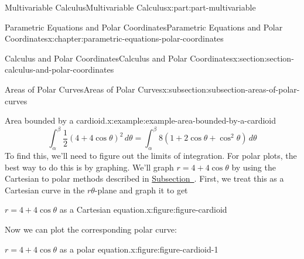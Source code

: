 \documentclass[twoside,10pt,]{book}
\numberwithin{equation}{part}
\begin{document}
\begin{partptx}{Multivariable Calculus}{}{Multivariable Calculus}{}{}{x:part:part-multivariable}
\begin{chapterptx}{Parametric Equations and Polar Coordinates}{}{Parametric Equations and Polar Coordinates}{}{}{x:chapter:parametric-equations-polar-coordinates}
\begin{sectionptx}{Calculus and Polar Coordinates}{}{Calculus and Polar Coordinates}{}{}{x:section:section-calculus-and-polar-coordinates}
\begin{subsectionptx}{Areas of Polar Curves}{}{Areas of Polar Curves}{}{}{x:subsection:subsection-areas-of-polar-curves}
\begin{example}{Area bounded by a cardioid.}{x:example:example-area-bounded-by-a-cardioid}
\begin{equation*}
\int_{\alpha}^{\beta}\frac{1}{2}(4+4\cos\theta)^{2}\,d\theta = \int_{\alpha}^{\beta}8(1+2\cos\theta+\cos^{2}\theta)\,d\theta
\end{equation*}
To find this, we'll need to figure out the limits of integration. For polar plots, the best way to do this is by graphing. We'll graph \(r=4+4\cos\theta\) by using the Cartesian to polar methods described in \hyperref[x:subsection:subsection-cartesian-to-polar-method]{Subsection~}. First, we treat this as a Cartesian curve in the \(r\theta\)-plane and graph it to get%
\begin{figureptx}{\(r = 4 + 4\cos\theta\) as a Cartesian equation.}{x:figure:figure-cardioid}{}%
\begin{image}{0}{1}{0}%
%
\end{image}%
\tcblower
\end{figureptx}%
Now we can plot the corresponding polar curve:%
\begin{figureptx}{\(r = 4 + 4\cos\theta\) as a polar equation.}{x:figure:figure-cardioid-1}{}%
\begin{image}{0}{1}{0}%
\end{image}
\end{figureptx}
\end{example}
\end{subsectionptx}
\end{sectionptx}
\end{chapterptx}
\end{partptx}
\end{document}
